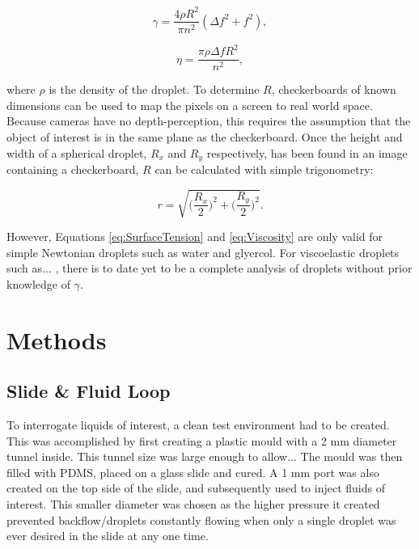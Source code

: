 \documentclass{physics_article_B}
\begin{document}
    \begin{equation} 
    \label{eq:SurfaceTension}
    \gamma = \frac{4\rho R^{2}}{\pi n^{2}}(\Delta f^{2} + f^{2}),
    \end{equation}
    
    \begin{equation} 
    \label{eq:Viscosity}
    \eta = \frac{\pi \rho \Delta f R^{2}}{n^{2}},
    \end{equation}

    where $\rho$ is the density of the droplet. To determine $R$, checkerboards of known dimensions can be used to map the pixels on a screen to real world space. Because cameras have no depth-perception, this requires the assumption that the object of interest is in the same plane as the checkerboard. Once the height and width of a spherical droplet, $R_x$ and $R_y$ respectively, has been found in an image containing a checkerboard, $R$ can be calculated with simple trigonometry:
            
            \begin{equation}\label{eq:radii}
                r = \sqrt{\Big(\frac{R_x}{2}\Big)^2 + \Big(\frac{R_y}{2}\Big)^2} .
            \end{equation}
    
    However, Equations \ref{eq:SurfaceTension} and \ref{eq:Viscosity} are only valid for simple Newtonian droplets such as water and glyercol. For viscoelastic droplets such as... , there is to date yet to be a complete analysis of droplets without prior knowledge of $\gamma$.
\section{Methods\label{sect:loop}}

    \subsection{Slide \& Fluid Loop}
    
        To interrogate liquids of interest, a clean test environment had to be created. This was accomplished by first creating a plastic mould with a 2 mm diameter tunnel inside. This tunnel size was large enough to allow...  The mould was then filled with PDMS, placed on a glass slide and cured. A 1 mm port was also created on the top side of the slide, and subsequently used to inject fluids of interest. This smaller diameter was chosen as the higher pressure it created prevented backflow/droplets constantly flowing when only a single droplet was ever desired in the slide at any one time.\\
        
\end{document}
